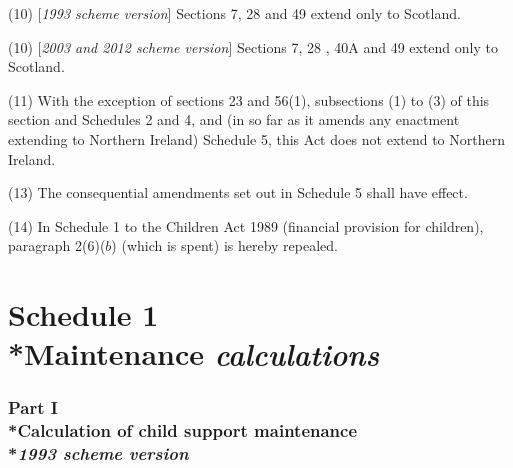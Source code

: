 \documentclass[12pt,a4paper]{article}
\begin{document}
(10) [\emph{1993 scheme version}] Sections 7, 28 and 49 extend only to Scotland.

(10) [\emph{2003 and 2012 scheme version}] Sections 7, 28%
, 40A  %
 and 49 extend only to Scotland.

(11) With the exception of sections 23 and 56(1), subsections (1)  to (3)  of this section and Schedules 2 and 4, and (in so far as it amends any enactment extending to Northern Ireland) Schedule 5, this Act does not extend to Northern Ireland.


(13) The consequential amendments set out in Schedule 5 shall have effect.

(14) In Schedule 1 to the Children Act 1989 (financial provision for children), paragraph 2(6)($b$)  (which is spent) is hereby repealed.


\bigskip

\small

\part[Schedule 1 --- Maintenance 
\emph{calculations}  %
]{Schedule 1\\*Maintenance 
\emph{calculations}  %
}

\section[Part I --- Calculation of child support maintenance --- \emph{1993 scheme version}]{Part I\\*Calculation of child support maintenance\\*\emph{1993 scheme version}}
\end{document}
